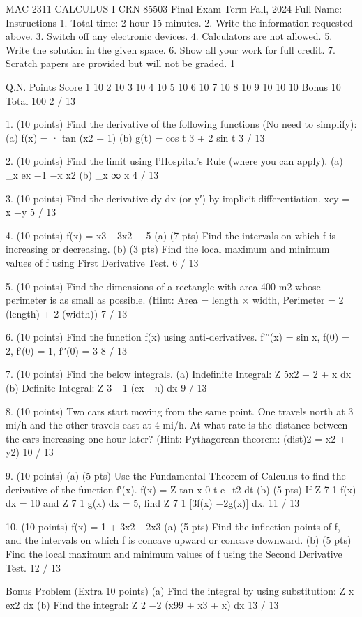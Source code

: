 MAC 2311 CALCULUS I CRN 85503
Final Exam
Term Fall, 2024
Full Name:
Instructions
1. Total time: 2 hour 15 minutes.
2. Write the information requested above.
3. Switch off any electronic devices.
4. Calculators are not allowed.
5. Write the solution in the given space.
6. Show all your work for full credit.
7. Scratch papers are provided but will not be graded.
1

Q.N.
Points
Score
1
10
2
10
3
10
4
10
5
10
6
10
7
10
8
10
9
10
10
10
Bonus
10
Total
100
2 / 13

1. (10 points) Find the derivative of the following functions (No need to simplify):
(a) f(x) =  · tan (x2 + 1)
(b) g(t) =
cos t
3 + 2 sin t
3 / 13

2. (10 points) Find the limit using l’Hospital’s Rule (where you can apply).
(a) \lim_{{x }}
ex −1 −x
x2
(b)
\lim_{{x \to ∞}}
x
4 / 13

3. (10 points) Find the derivative dy
dx (or y′) by implicit differentiation.
xey = x −y
5 / 13

4. (10 points) f(x) = x3 −3x2 + 5
(a) (7 pts) Find the intervals on which f is increasing or decreasing.
(b) (3 pts) Find the local maximum and minimum values of f using First Derivative Test.
6 / 13

5. (10 points) Find the dimensions of a rectangle with area 400 m2 whose perimeter is as small as possible.
(Hint: Area = length × width, Perimeter = 2 (length) + 2 (width))
7 / 13

6. (10 points) Find the function f(x) using anti-derivatives.
f′′′(x) = sin x,
f(0) = 2, f′(0) = 1, f′′(0) = 3
8 / 13

7. (10 points) Find the below integrals.
(a) Indefinite Integral:
Z 5x2 + 2 + 
x
dx
(b) Definite Integral:
Z 3
−1
(ex −π) dx
9 / 13

8. (10 points) Two cars start moving from the same point. One travels north at 3 mi/h and the other travels
east at 4 mi/h. At what rate is the distance between the cars increasing one hour later?
(Hint: Pythagorean theorem: (dist)2 = x2 + y2)
10 / 13

9. (10 points)
(a) (5 pts) Use the Fundamental Theorem of Calculus to find the derivative of the function f′(x).
f(x) =
Z tan x
0
t e−t2 dt
(b) (5 pts) If
Z 7
1
f(x) dx = 10 and
Z 7
1
g(x) dx = 5,
find
Z 7
1
[3f(x) −2g(x)] dx.
11 / 13

10. (10 points) f(x) = 1 + 3x2 −2x3
(a) (5 pts) Find the inflection points of f, and the intervals on which f is concave upward or concave
downward.
(b) (5 pts) Find the local maximum and minimum values of f using the Second Derivative Test.
12 / 13

Bonus Problem (Extra 10 points)
(a) Find the integral by using substitution:
Z
x ex2 dx
(b) Find the integral:
Z 2
−2
(x99 + x3 + x) dx
13 / 13

